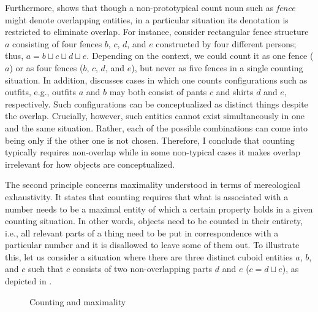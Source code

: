 Furthermore, \citet{rothstein2010counting} shows that though a non-prototypical count noun such as \textit{fence} might denote overlapping entities, in a particular situation its denotation is restricted to eliminate overlap. For instance, consider rectangular fence structure $a$ consisting of four fences $b$, $c$, $d$, and $e$ constructed by four different persons; thus, $a = b\sqcup c\sqcup d\sqcup e$. Depending on the context, we could count it as one fence ($a$) or as four fences ($b$, $c$, $d$, and $e$), but never as five fences in a single counting situation. In addition, \citet{krifka2009counting} discusses cases in which one counts configurations such as outfits, e.g., outfits $a$ and $b$ may both consist of pants $c$ and shirts $d$ and $e$, respectively. Such configurations can be conceptualized as distinct things despite the overlap. Crucially, however, such entities cannot exist simultaneously in one and the same situation. Rather, each of the possible combinations can come into being only if the other one is not chosen. Therefore, I conclude that counting typically requires non-overlap while in some non-typical cases it makes overlap irrelevant for how objects are conceptualized. 

The second principle concerns maximality understood in terms of mereological exhaustivity. It states that counting requires that what is associated with a number needs to be a maximal entity of which a certain property holds in a given counting situation. In other words, objects need to be counted in their entirety, i.e., all relevant parts of a thing need to be put in correspondence with a particular number and it is disallowed to leave some of them out. To illustrate this, let us consider a situation where there are three distinct cuboid entities $a$, $b$, and $c$ such that $c$ consists of two non-overlapping parts $d$ and $e$ ($c = d\sqcup e$), as depicted in . 

\begin{figure}[h!]
\centering
{}
\caption{Counting and maximality}
\label{fig:counting-and-maximality}
\end{figure}

